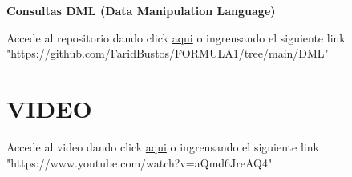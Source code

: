 \documentclass{article}
\begin{document}
	
	\Large{\textbf{Consultas DML (Data Manipulation Language)}} \par
	\textnormal{Accede al repositorio dando click \href{https://github.com/FaridBustos/FORMULA1/tree/main/DML}{aqui} o ingrensando el siguiente link "https://github.com/FaridBustos/FORMULA1/tree/main/DML"}
	
	\section{VIDEO}
	\textnormal{Accede al video dando click \href{https://www.youtube.com/watch?v=aQmd6JreAQ4}{aqui} o ingrensando el siguiente link }\\
	"https://www.youtube.com/watch?v=aQmd6JreAQ4"
	
\end{document}
